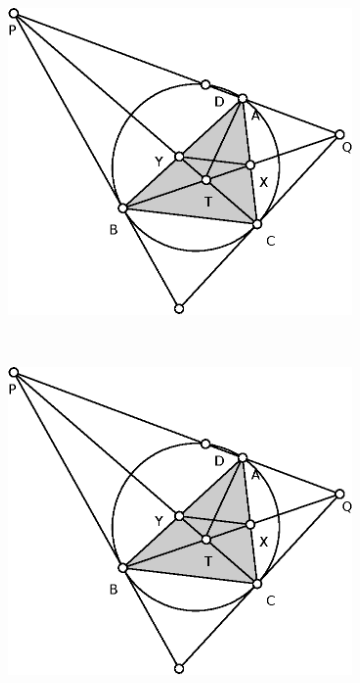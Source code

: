 \documentclass{article}
\begin{document}
\begin{enumerate}
    \begin{figure}[!ht]
    \centering
    \begin{subfigure}[b]{0.45\textwidth}
    \includegraphics[width=\textwidth]{China2017.eps}
    \caption{}\label{fig:China2017}
    \end{subfigure}~
    \begin{subfigure}[b]{0.45\textwidth}
    \includegraphics[width=\textwidth]{China2017.eps}
    \caption{}
    \end{subfigure}
    \caption{}
    \end{figure}

\end{enumerate}
\end{document}
